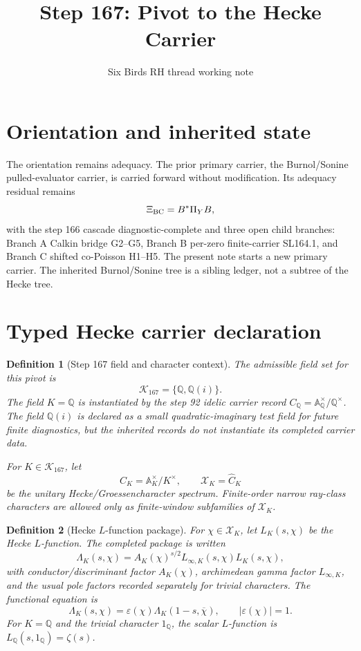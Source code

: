 \documentclass[11pt]{article}
\title{Step 167: Pivot to the Hecke Carrier}
\author{Six Birds RH thread working note}
\date{}
\newtheorem{definition}{Definition}
\newcommand{\A}{\mathbb A}
\newcommand{\Q}{\mathbb Q}
\newcommand{\X}{\mathcal X}
\newcommand{\XiBC}{\Xi_{\rm BC}}
\begin{document}
\maketitle

\section{Orientation and inherited state}

The orientation remains adequacy.  The prior primary carrier, the Burnol/Sonine pulled-evaluator carrier, is carried forward without modification.  Its adequacy residual remains
\[
  \XiBC=B^*\Pi_YB,
\]
with the step 166 cascade diagnostic-complete and three open child branches: Branch A Calkin bridge G2--G5, Branch B per-zero finite-carrier SL164.1, and Branch C shifted co-Poisson H1--H5.  The present note starts a new primary carrier.  The inherited Burnol/Sonine tree is a sibling ledger, not a subtree of the Hecke tree.

\section{Typed Hecke carrier declaration}

\begin{definition}[Step 167 field and character context]
The admissible field set for this pivot is
\[
  \mathcal K_{167}=\{\Q,\Q(i)\}.
\]
The field \(K=\Q\) is instantiated by the step 92 idelic carrier record \(C_{\Q}=\A_\Q^\times/\Q^\times\).  The field \(\Q(i)\) is declared as a small quadratic-imaginary test field for future finite diagnostics, but the inherited records do not instantiate its completed carrier data.

For \(K\in\mathcal K_{167}\), let
\[
  C_K=\A_K^\times/K^\times,
  \qquad
  \X_K=\widehat C_K
\]
be the unitary Hecke/Groessencharacter spectrum.  Finite-order narrow ray-class characters are allowed only as finite-window subfamilies of \(\X_K\).
\end{definition}

\begin{definition}[Hecke \(L\)-function package]
For \(\chi\in\X_K\), let \(L_K(s,\chi)\) be the Hecke \(L\)-function.  The completed package is written
\[
  \Lambda_K(s,\chi)
  =
  A_K(\chi)^{s/2}L_{\infty,K}(s,\chi)L_K(s,\chi),
\]
with conductor/discriminant factor \(A_K(\chi)\), archimedean gamma factor \(L_{\infty,K}\), and the usual pole factors recorded separately for trivial characters.  The functional equation is
\[
  \Lambda_K(s,\chi)
  =
  \varepsilon(\chi)\Lambda_K(1-s,\overline{\chi}),
  \qquad |\varepsilon(\chi)|=1.
\]
For \(K=\Q\) and the trivial character \(1_\Q\), the scalar \(L\)-function is \(L_\Q(s,1_\Q)=\zeta(s)\).
\end{definition}
\end{document}
